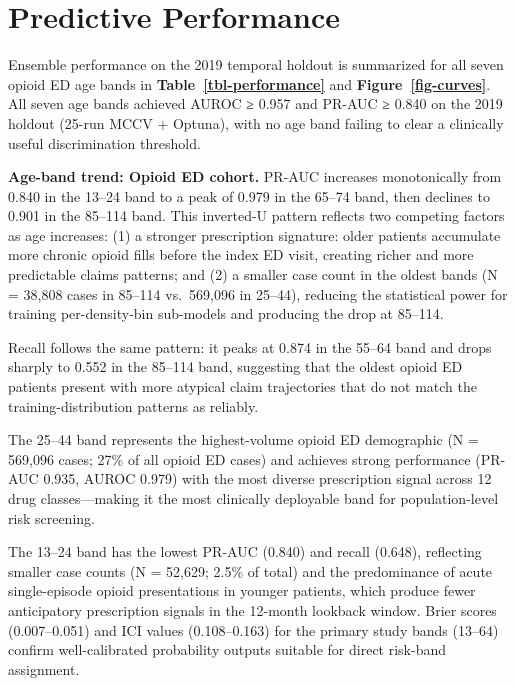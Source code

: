 \documentclass[
  12pt,
]{book}
\begin{document}
\section{Predictive Performance}\label{sec-performance}

Ensemble performance on the 2019 temporal holdout is summarized for all
seven opioid ED age bands in \textbf{Table~\ref{tbl-performance}} and
\textbf{Figure~\ref{fig-curves}}. All seven age bands achieved AUROC ≥
0.957 and PR-AUC ≥ 0.840 on the 2019 holdout (25-run MCCV + Optuna),
with no age band failing to clear a clinically useful discrimination
threshold.

\textbf{Age-band trend: Opioid ED cohort.} PR-AUC increases
monotonically from 0.840 in the 13--24 band to a peak of 0.979 in the
65--74 band, then declines to 0.901 in the 85--114 band. This inverted-U
pattern reflects two competing factors as age increases: (1) a stronger
prescription signature: older patients accumulate more chronic opioid
fills before the index ED visit, creating richer and more predictable
claims patterns; and (2) a smaller case count in the oldest bands (N =
38,808 cases in 85--114 vs.~569,096 in 25--44), reducing the statistical
power for training per-density-bin sub-models and producing the drop at
85--114.

Recall follows the same pattern: it peaks at 0.874 in the 55--64 band
and drops sharply to 0.552 in the 85--114 band, suggesting that the
oldest opioid ED patients present with more atypical claim trajectories
that do not match the training-distribution patterns as reliably.

The 25--44 band represents the highest-volume opioid ED demographic (N =
569,096 cases; 27\% of all opioid ED cases) and achieves strong
performance (PR-AUC 0.935, AUROC 0.979) with the most diverse
prescription signal across 12 drug classes---making it the most
clinically deployable band for population-level risk screening.

The 13--24 band has the lowest PR-AUC (0.840) and recall (0.648),
reflecting smaller case counts (N = 52,629; 2.5\% of total) and the
predominance of acute single-episode opioid presentations in younger
patients, which produce fewer anticipatory prescription signals in the
12-month lookback window. Brier scores (0.007--0.051) and ICI values
(0.108--0.163) for the primary study bands (13--64) confirm
well-calibrated probability outputs suitable for direct risk-band
assignment.
\end{document}
